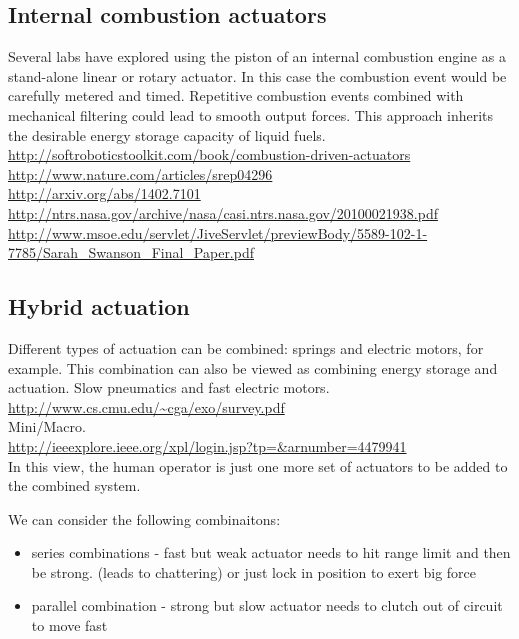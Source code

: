 \documentclass[letterpaper,12pt,fullpage]{article}
\begin{document}
\subsection{Internal combustion actuators}

Several labs have explored using the piston of an internal combustion
engine as a stand-alone linear or rotary actuator. In this case
the combustion event would be carefully metered and timed. Repetitive
combustion events combined with mechanical filtering could lead to smooth
output forces. This approach inherits the desirable energy storage capacity
of liquid fuels.\\ 
\url{http://softroboticstoolkit.com/book/combustion-driven-actuators}\\
\url{http://www.nature.com/articles/srep04296}\\
\url{http://arxiv.org/abs/1402.7101}\\
\url{http://ntrs.nasa.gov/archive/nasa/casi.ntrs.nasa.gov/20100021938.pdf}\\
\url{http://www.msoe.edu/servlet/JiveServlet/previewBody/5589-102-1-7785/Sarah_Swanson_Final_Paper.pdf}

\subsection{Hybrid actuation}

Different types of actuation can be combined: springs and electric motors,
for example. This combination can also be viewed as combining energy
storage and actuation. Slow pneumatics and fast electric motors.\\
\url{http://www.cs.cmu.edu/~cga/exo/survey.pdf}\\
Mini/Macro.\\
\url{http://ieeexplore.ieee.org/xpl/login.jsp?tp=&arnumber=4479941}\\
In this view, the human operator is just
one more set of actuators to be added to the combined system.

We can consider the following combinaitons:
\begin{itemize}
\item
series combinations - fast but weak actuator needs to hit range limit and then be strong. (leads to chattering) or just lock in position to exert big force
\item
parallel combination - strong but slow actuator needs to clutch out of circuit to move fast
\end{itemize}
\end{document}
